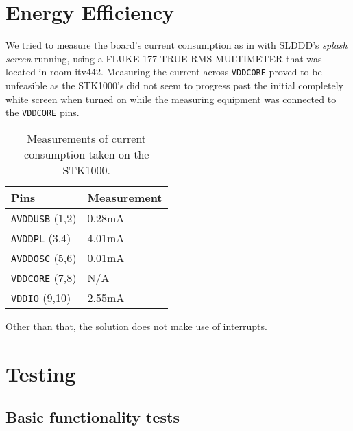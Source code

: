 \section{Energy Efficiency}

	We tried to measure the board's current consumption as in \cite{tdt4258-1} with SLDDD's \textit{splash screen} running, using a FLUKE 177 TRUE RMS MULTIMETER that was located in room itv442.
 	Measuring the current across \texttt{VDDCORE} proved to be unfeasible as the STK1000's did not seem to progress past the initial completely white screen when turned on while the measuring equipment was connected to the \texttt{VDDCORE} pins.

\begin{table}[h]
	\centering
    \begin{tabular}{|l|l|}
    \hline
    Pins & Measurement \\ \hline
    \texttt{AVDDUSB} (1,2) & 0.28mA \\ \hline
    \texttt{AVDDPL} (3,4) & 4.01mA \\ \hline
    \texttt{AVDDOSC} (5,6) & 0.01mA \\ \hline
    \texttt{VDDCORE} (7,8) & N/A \\ \hline
    \texttt{VDDIO} (9,10) & 2.55mA \\ \hline
    \end{tabular}
    \caption{Measurements of current consumption taken on the STK1000.}
    \label{table-currentmeasurements}
\end{table}
	
	Other than that, the solution does not make use of interrupts.

\section{Testing}
\subsection{Basic functionality tests}
